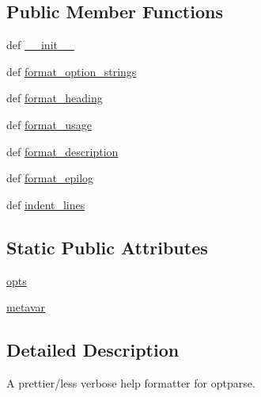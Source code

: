 \subsection*{Public Member Functions}
\begin{DoxyCompactItemize}
\item 
def \hyperlink{classpip_1_1__internal_1_1cli_1_1parser_1_1PrettyHelpFormatter_ab3aa615b916a29f1bdf3f315fb74540c}{\+\_\+\+\_\+init\+\_\+\+\_\+}
\item 
def \hyperlink{classpip_1_1__internal_1_1cli_1_1parser_1_1PrettyHelpFormatter_ad8b431644140133ecb0613fdae721cbf}{format\+\_\+option\+\_\+strings}
\item 
def \hyperlink{classpip_1_1__internal_1_1cli_1_1parser_1_1PrettyHelpFormatter_ae040500244d8d4de96415d4dbbf228cd}{format\+\_\+heading}
\item 
def \hyperlink{classpip_1_1__internal_1_1cli_1_1parser_1_1PrettyHelpFormatter_a2e8e03868abb3e5564ab97b0a7296887}{format\+\_\+usage}
\item 
def \hyperlink{classpip_1_1__internal_1_1cli_1_1parser_1_1PrettyHelpFormatter_a54dd6050e3680e6936ddc2bcb90b2827}{format\+\_\+description}
\item 
def \hyperlink{classpip_1_1__internal_1_1cli_1_1parser_1_1PrettyHelpFormatter_ab5400f17b66614e9e76e3bef73184289}{format\+\_\+epilog}
\item 
def \hyperlink{classpip_1_1__internal_1_1cli_1_1parser_1_1PrettyHelpFormatter_a91f7e295de1e7063125e49c9fecaf69f}{indent\+\_\+lines}
\end{DoxyCompactItemize}
\subsection*{Static Public Attributes}
\begin{DoxyCompactItemize}
\item 
\hyperlink{classpip_1_1__internal_1_1cli_1_1parser_1_1PrettyHelpFormatter_a7f979374a7b1032098e4ec8c8f3840a2}{opts}
\item 
\hyperlink{classpip_1_1__internal_1_1cli_1_1parser_1_1PrettyHelpFormatter_a1711034c0ff3a20cc1e611d2c881d29b}{metavar}
\end{DoxyCompactItemize}


\subsection{Detailed Description}
\begin{DoxyVerb}A prettier/less verbose help formatter for optparse.\end{DoxyVerb}
 

